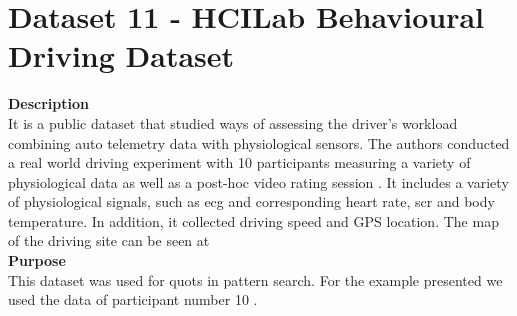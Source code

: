 \section{Dataset 11 - HCILab Behavioural Driving Dataset}
\label{dat:dataset11}
\textbf{Description}\hfill \\
It is a public dataset that studied ways of assessing the driver's workload combining auto telemetry data with physiological sensors. The authors conducted a real world driving experiment with 10 participants measuring a variety of physiological data as well as a post-hoc video rating session \cite{hcilab}. It includes a variety of physiological signals, such as \gls{ecg} and corresponding heart rate, \gls{scr} and body temperature. In addition, it collected driving speed and GPS location. The map of the driving site can be seen at \cite{hcilab}\\
\textbf{Purpose}\hfill \\
This dataset was used for \gls{quots} in pattern search. For the example presented we used the data of participant number 10 \cite{hcilab}.

